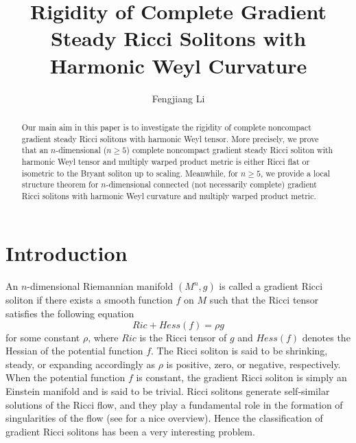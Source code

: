 \documentclass{amsart}
\theoremstyle{definition}
\theoremstyle{remark}
\numberwithin{equation}{section}
\begin{document}
\makeatletter
{}
\makeatother

\author{Fengjiang Li}
\address[Fengjiang Li]
   {1. Mathematical Science Research Center\\ Chongqing University of Technology\\ Chongqing\\ 400054. 
	. School of Mathematical Sciences\\ East China Normal University\\
	Shanghai\\ 200241}





\title[Gradient Steady Ricci Solitons with Harmonic Weyl Curvature]
{Rigidity of Complete Gradient Steady Ricci Solitons with Harmonic Weyl Curvature}


\begin{abstract}
Our main aim in this paper is to investigate the rigidity of complete noncompact gradient steady Ricci solitons with harmonic Weyl tensor. More precisely, we prove that an $n$-dimensional ($n\geq 5$) complete noncompact gradient steady Ricci soliton with harmonic Weyl tensor and multiply warped product metric is either Ricci flat or isometric to the Bryant soliton up to scaling. 
Meanwhile, for $n\ge 5$, we provide a local structure theorem for $n$-dimensional connected (not necessarily complete) gradient Ricci solitons with harmonic Weyl curvature and multiply warped product metric.
\end{abstract}

\maketitle

\section{Introduction}
An $n$-dimensional Riemannian manifold $(M^{n},g)$ is called a gradient Ricci soliton if there exists a smooth function $f$ on $M$ such that the Ricci tensor satisfies the following equation
\begin{equation}\label{1.1}
Ric+Hess(f)=\rho g
\end{equation}
for some constant $\rho$, where $Ric$ is the Ricci tensor of $g$ and $Hess(f)$ denotes the Hessian of the potential function $f$. 
The Ricci soliton is said to be shrinking, steady, or expanding accordingly as $\rho$ is positive, zero, or negative, respectively. When the potential function $f$ is constant, the gradient Ricci soliton is simply an Einstein manifold and is said to be trivial. Ricci solitons generate self-similar solutions of the Ricci flow, 
and they play a fundamental role in the formation of singularities of the flow (see \cite{Cao1} for a nice overview).
Hence the classification of gradient Ricci solitons has been a very interesting problem. 
\end{document}
